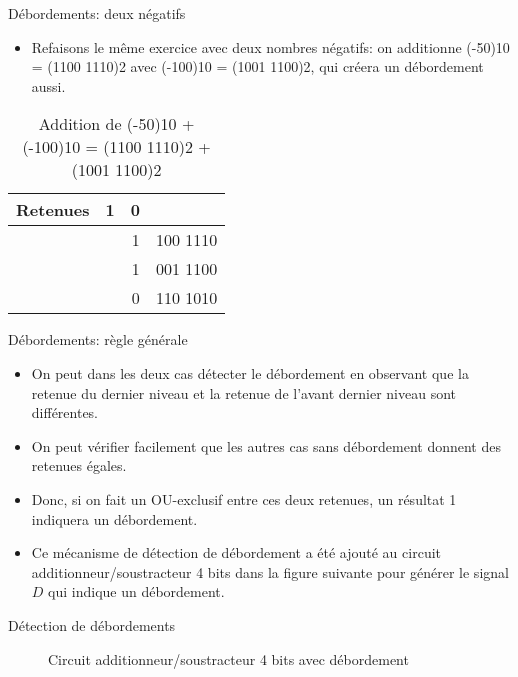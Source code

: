 \documentclass[presentation]{beamer}
\begin{document}
\begin{frame}[label={sec:org232aebb}]{Débordements: deux négatifs}
\begin{itemize}
\item Refaisons le même exercice avec deux nombres négatifs: on additionne (-50)10 = (1100 1110)2 avec (-100)10 = (1001 1100)2, qui créera un débordement aussi.
\end{itemize}

\begin{table}[htbp]
\caption{\label{tab:orgf61a85e}Addition de (-50)10 + (-100)10 = (1100 1110)2 + (1001 1100)2}
\centering
\begin{tabular}{lrrl}
Retenues & 1 & 0 & \\
\hline
 &  & 1 & 100 1110\\
 &  & 1 & 001 1100\\
\hline
 &  & 0 & 110 1010\\
\end{tabular}
\end{table}
\end{frame}

\begin{frame}[label={sec:org988773c}]{Débordements: règle générale}
\begin{itemize}
\item On peut dans les deux cas détecter le débordement en observant que la retenue du dernier niveau et la retenue de l'avant dernier niveau sont différentes.

\item On peut vérifier facilement que les autres cas sans débordement donnent des retenues égales.

\item Donc, si on fait un OU-exclusif entre ces deux retenues, un résultat 1 indiquera un débordement.

\item Ce mécanisme de détection de débordement a été ajouté au circuit additionneur/soustracteur 4 bits dans la figure suivante pour générer le signal \(D\) qui indique un débordement.
\end{itemize}
\end{frame}

\begin{frame}[label={sec:org3f610c2}]{Détection de débordements}
\begin{figure}[htbp]
\centering

\caption{\label{fig:org2ace8d4}Circuit additionneur/soustracteur 4 bits avec débordement}
\end{figure}
\end{frame}
\end{document}

